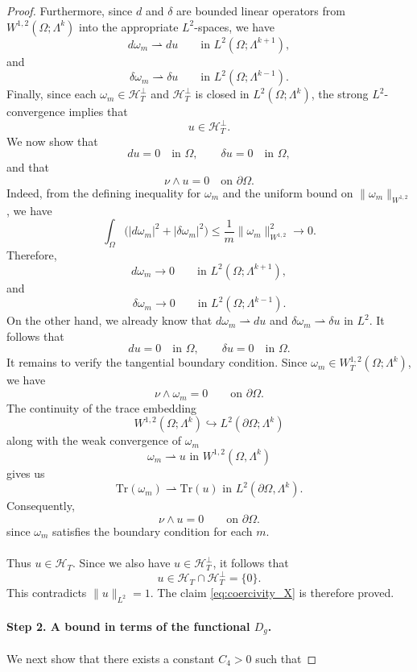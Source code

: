 \begin{proof}
Furthermore, since $d$ and $\delta$ are bounded linear operators from
$W^{1,2}(\Omega;\Lambda^k)$ into the appropriate $L^2$-spaces, we have
\[
    d\omega_m\rightharpoonup du
    \qquad\text{in }L^2(\Omega;\Lambda^{k+1}),
\]
and
\[
    \delta\omega_m\rightharpoonup\delta u
    \qquad\text{in }L^2(\Omega;\Lambda^{k-1}).
\]
Finally, since each $\omega_m\in\mathcal H_T^\perp$ and
$\mathcal H_T^\perp$ is closed in $L^2(\Omega;\Lambda^k)$, the strong
$L^2$-convergence implies that
\[
    u\in\mathcal H_T^\perp.
\]
We now show that
\[
    du=0\quad\text{in }\Omega,\qquad
    \delta u=0\quad\text{in }\Omega,
\]
and that
\[
    \nu\wedge u=0\quad\text{on }\partial\Omega.
\]
Indeed, from the defining inequality for $\omega_m$ and the uniform
bound on $\|\omega_m\|_{W^{1,2}}$, we have
\[
    \int_\Omega
    \bigl(|d\omega_m|^2+|\delta\omega_m|^2\bigr)
    \leq
    \frac1m\|\omega_m\|_{W^{1,2}}^2
    \longrightarrow 0.
\]
Therefore,
\[
    d\omega_m\longrightarrow 0
    \qquad\text{in }L^2(\Omega;\Lambda^{k+1}),
\]
and
\[
    \delta\omega_m\longrightarrow 0
    \qquad\text{in }L^2(\Omega;\Lambda^{k-1}).
\]
On the other hand, we already know that
$d\omega_m\rightharpoonup du$ and
$\delta\omega_m\rightharpoonup\delta u$ in $L^2$. It follows that
\[
    du=0\quad\text{in }\Omega,
    \qquad
    \delta u=0\quad\text{in }\Omega.
\]
It remains to verify the tangential boundary condition. Since
$\omega_m\in W_T^{1,2}(\Omega;\Lambda^k)$, we have
\[
    \nu\wedge\omega_m=0
    \qquad\text{on }\partial\Omega.
\]
The continuity of the trace embedding
\[
    W^{1,2}(\Omega;\Lambda^k)
    \hookrightarrow L^2(\partial\Omega;\Lambda^k)
\]
along with the weak convergence of $\omega_m$ $$\omega_m \rightharpoonup u \text{ in }W^{1,2}(\Omega,\Lambda^k) $$
gives us $$\mathrm{Tr}(\omega_m)\rightharpoonup \mathrm{Tr}(u) \text{ in }L^2(\partial\Omega,\Lambda^k). $$
Consequently,
\[
    \nu\wedge u=0
    \qquad\text{on }\partial\Omega.
\]
since $\omega_m$ satisfies the boundary condition for each $m$.
\\\\ Thus $u\in\mathcal H_T$. Since we also have
$u\in\mathcal H_T^\perp$, it follows that
\[
    u\in\mathcal H_T\cap\mathcal H_T^\perp=\{0\}.
\]
This contradicts $\|u\|_{L^2}=1$. The claim
\eqref{eq:coercivity_X} is therefore proved.
\\\\ \textbf{Step 2. A bound in terms of the functional $D_g$.}
\\\\ We next show that there exists a constant $C_4>0$ such that

\end{proof}
